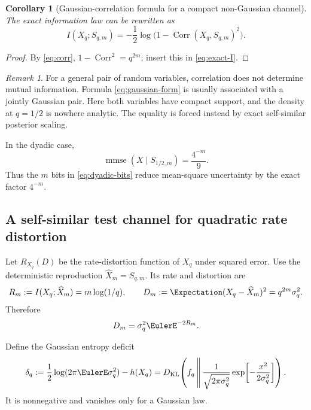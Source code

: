 \documentclass[11pt,oneside]{article}
\newtheorem{corollary}[theorem]{Corollary}
\theoremstyle{definition}
\theoremstyle{remark}
\newtheorem{remark}[theorem]{Remark}
\newcommand{\Corr}{\operatorname{Corr}}
\newcommand{\KL}{D_{\mathrm{KL}}}
\newcommand{\MI}{I}
\newcommand{\mmse}{\operatorname{mmse}}
\newcommand{\GeometricPrefixReproduction}[1]{\widehat{X}_{#1}}
\begin{document}
\begin{corollary}[Gaussian-correlation formula for a compact non-Gaussian channel]
\label{cor:gaussian-form}
The exact information law can be rewritten as
\begin{equation}
 \boxed{\MI(X_q;S_{q,m})
 =-\frac12\log\bigl(1-\Corr(X_q,S_{q,m})^2\bigr).}
 \label{eq:gaussian-form}
\end{equation}
\end{corollary}

\begin{proof}
By \eqref{eq:corr}, $1-\Corr^2=q^{2m}$; insert this in
\eqref{eq:exact-I}.
\end{proof}

\begin{remark}
For a general pair of random variables, correlation does not determine mutual
information.  Formula \eqref{eq:gaussian-form} is usually associated with a
jointly Gaussian pair.  Here both variables have compact support, and the density
at $q=1/2$ is nowhere analytic.  The equality is forced instead by exact
self-similar posterior scaling.
\end{remark}

In the dyadic case,
\begin{equation}
 \mmse(X\mid S_{1/2,m})=\frac{4^{-m}}9.
 \label{eq:dyadic-mmse}
\end{equation}
Thus the $m$ bits in \eqref{eq:dyadic-bits} reduce mean-square uncertainty by the
exact factor $4^{-m}$.

\subsection{A self-similar test channel for quadratic rate distortion}

Let $R_{X_q}(D)$ be the rate-distortion function of $X_q$ under squared error.
Use the deterministic reproduction $\GeometricPrefixReproduction{m}=S_{q,m}$.  Its rate and
distortion are
\begin{equation}
 R_m:=I(X_q;\GeometricPrefixReproduction{m})=m\log(1/q),
 \qquad
 D_m:=\Expectation(X_q-\GeometricPrefixReproduction{m})^2=q^{2m}\sigma_q^2.
 \label{eq:RD-points}
\end{equation}
Therefore
\begin{equation}
 D_m=\sigma_q^2\EulerE^{-2R_m}.
 \label{eq:selfsimilar-RD}
\end{equation}

Define the Gaussian entropy deficit
\begin{equation}
 \delta_q
 :=\frac12\log(2\pi\EulerE\sigma_q^2)-h(X_q)
 =\KL\!\left(f_q\,\middle\|\,
   \frac{1}{\sqrt{2\pi\sigma_q^2}}
   \exp\!\left[-\frac{x^2}{2\sigma_q^2}\right]\right).
 \label{eq:deficit}
\end{equation}
It is nonnegative and vanishes only for a Gaussian law.
\end{document}
